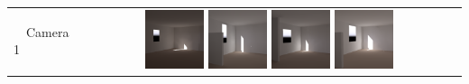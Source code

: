 \documentclass[landscape,20pt]{sciposter}
\begin{document}
\begin{minipage}[t]{17in}
  \vspace{-4.6in}
  \hspace{.5in}
\begin{minipage}{0.158\textwidth}~{\color{white}{\bf ground-truth}}\end{minipage} 
\begin{minipage}{0.158\textwidth}~{\color{white}{\bf A1}}\end{minipage}
\begin{minipage}{0.158\textwidth}~{\color{white}{\bf A2}}\end{minipage}
\begin{minipage}{0.158\textwidth}~{\color{white}{\bf A3}}\end{minipage}
\begin{minipage}{0.158\textwidth}~{\color{white}{\bf A4}}\end{minipage} 
\begin{minipage}{0.158\textwidth}~{\color{white}{\bf A5}}\end{minipage} \\
\vspace{4.2in}
\\
\begin{tabular}{lc}
\begin{sideways}~~Camera 1\end{sideways}&
  \includegraphics[width=0.158\textwidth]{../gi2012_userstudy/images/renderings/renovations/063_camera_chris_march_crop.png}
  \includegraphics[width=0.158\textwidth]{../gi2012_userstudy/images/renderings/renovations/050_camera_chris_march.png}
  \includegraphics[width=0.158\textwidth]{../gi2012_userstudy/images/renderings/no_renovations/070_camera_chris_march.png}
  \includegraphics[width=0.158\textwidth]{../gi2012_userstudy/images/renderings/renovations/098_camera_chris_march.png}

\end{tabular}
\end{minipage}
\end{document}
